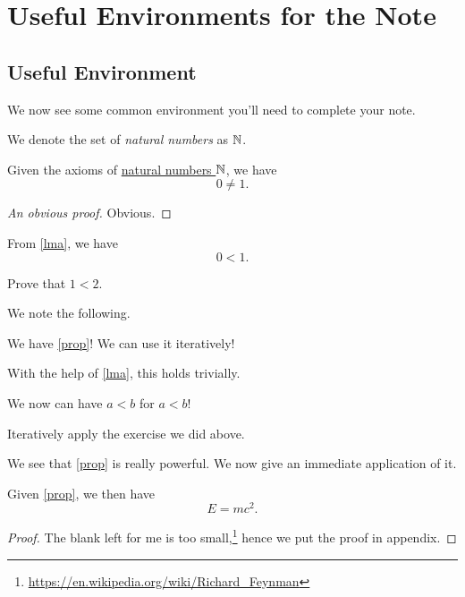 \chapter{Useful Environments for the Note}
\section{Useful Environment}
We now see some common environment you'll need to complete your note.

\begin{definition}\label{def}
  We denote the set of \emph{natural numbers} as \(\mathbb{\MakeUppercase{n}} \).
\end{definition}


\begin{lemma}\label{lma}
  Given the axioms of \hyperref[def]{natural numbers \(\mathbb{\MakeUppercase{n}} \)}, we have
  \[
    0\neq 1.
  \]
\end{lemma}
\begin{proof}[An obvious proof]
  Obvious.
\end{proof}
\begin{proposition}\label{prop}
  From \autoref{lma}, we have
  \[
    0<1.
  \]
\end{proposition}
\begin{exercise}
  Prove that \(1 < 2\).
\end{exercise}
\begin{answer}
  We note the following.
  \begin{note}
    We have \autoref{prop}! We can use it iteratively!
  \end{note}
  With the help of \autoref{lma}, this holds trivially.
\end{answer}
\begin{eg}
  We now can have \(a < b\) for \(a < b\)!
\end{eg}
\begin{explanation}
  Iteratively apply the exercise we did above.
\end{explanation}
\begin{remark}
  We see that \autoref{prop} is really powerful. We now give an immediate application of it.
\end{remark}

\begin{theorem}\label{thm}
  Given \autoref{prop}, we then have
  \[
    E = mc^2.
  \]
\end{theorem}
\begin{proof}
  The blank left for me is too small,\footnote{\url{https://en.wikipedia.org/wiki/Richard_Feynman}} hence we put the proof in appendix.
\end{proof}

